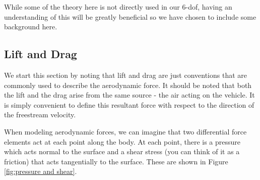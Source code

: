 \documentclass[12pt]{report}
\begin{document}
While some of the theory here is not directly used in our 6-\gls{dof}, having an understanding of this will be greatly beneficial so we have chosen to include some background here. 
\subsection{Lift and Drag}\label{Lift and Drag}
We start this section by noting that lift and drag are just conventions that are commonly used to describe the aerodynamic force. It should be noted that both the lift and the drag arise from the same source - the air acting on the vehicle. It is simply convenient to define this resultant force with respect to the direction of the freestream velocity.

When modeling aerodynamic forces, we can imagine that two differential force elements act at each point along the body. At each point, there is a pressure which acts normal to the surface and a shear stress (you can think of it as a friction) that acts tangentially to the surface. These are shown in Figure \ref{fig:pressure and shear}.
\end{document}
